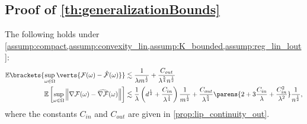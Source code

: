 \subsection{Proof of \cref{th:generalizationBounds}}\label{app_sub:main_proof}
\begin{theorem}\label{th:gen_bound}
The following holds under \cref{assump:compact,assump:convexity_lin,assump:K_bounded,assump:reg_lin_lout}:
\begin{align*}
    \mathbb{E}\brackets{\sup_{\omega\in\Omega}\verts{\mathcal{F}(\omega)-\hat{\mathcal{F}}(\omega)}}
    &\lesssim
    \frac{1}{\lambda m^{\frac{1}{2}}}+\frac{C_{out}}{\lambda^{\frac{5}{4}} n^{\frac{1}{2}}}\\
    \mathbb{E}\left[\sup_{\omega\in\Omega}\left\|\nabla\mathcal{F}(\omega)-\widehat{\nabla\mathcal{F}}(\omega)\right\|\right]
    &\lesssim
    \frac{1}{\lambda}\left(d^{\frac{1}{2}} + \frac{C_{in}}{\lambda^{\frac{1}{4}}}\right)\frac{1}{m^{\frac{1}{2}}} + \frac{C_{out}}{\lambda^{\frac{5}{4}}}\parens{2 + 3\frac{C_{in}}{\lambda}+\frac{C_{in}^2}{\lambda^2}}\frac{1}{n^{\frac{1}{2}}},
\end{align*}
where the constants $C_{in}$ and $C_{out}$ are given in \cref{prop:lip_continuity_out}.
\end{theorem}

